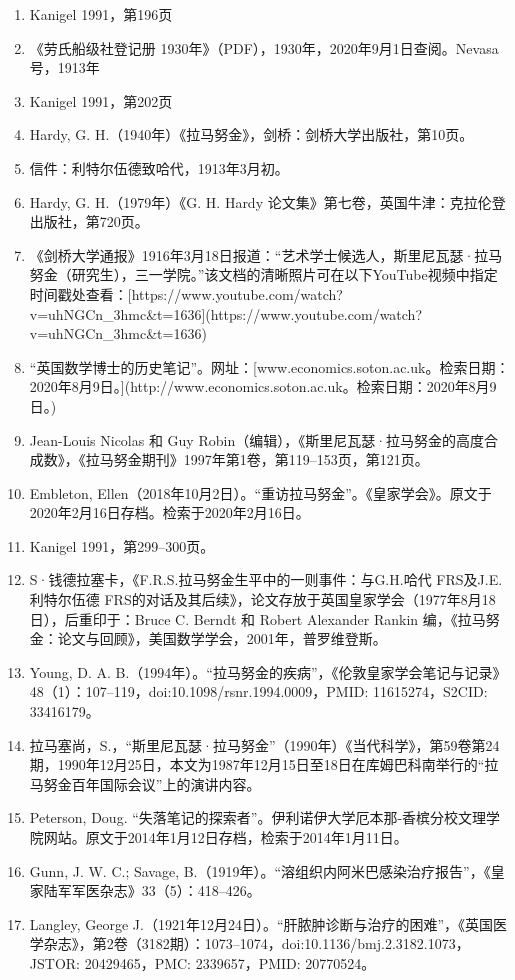 \begin{enumerate}
\item Kanigel 1991，第196页
\item 《劳氏船级社登记册 1930年》（PDF），1930年，2020年9月1日查阅。Nevasa号，1913年
\item Kanigel 1991，第202页
\item Hardy, G. H.（1940年）《拉马努金》，剑桥：剑桥大学出版社，第10页。
\item 信件：利特尔伍德致哈代，1913年3月初。
\item Hardy, G. H.（1979年）《G. H. Hardy 论文集》第七卷，英国牛津：克拉伦登出版社，第720页。
\item 《剑桥大学通报》1916年3月18日报道：“艺术学士候选人，斯里尼瓦瑟·拉马努金（研究生），三一学院。”该文档的清晰照片可在以下YouTube视频中指定时间戳处查看：[https://www.youtube.com/watch?v=uhNGCn\_3hmc\&t=1636](https://www.youtube.com/watch?v=uhNGCn_3hmc&t=1636)
\item “英国数学博士的历史笔记”。网址：[www.economics.soton.ac.uk。检索日期：2020年8月9日。](http://www.economics.soton.ac.uk。检索日期：2020年8月9日。)
\item Jean-Louis Nicolas 和 Guy Robin（编辑），《斯里尼瓦瑟·拉马努金的高度合成数》，《拉马努金期刊》1997年第1卷，第119–153页，第121页。
\item Embleton, Ellen（2018年10月2日）。“重访拉马努金”。《皇家学会》。原文于2020年2月16日存档。检索于2020年2月16日。
\item Kanigel 1991，第299–300页。
\item S·钱德拉塞卡，《F.R.S.拉马努金生平中的一则事件：与G.H.哈代 FRS及J.E.利特尔伍德 FRS的对话及其后续》，论文存放于英国皇家学会（1977年8月18日），后重印于：Bruce C. Berndt 和 Robert Alexander Rankin 编，《拉马努金：论文与回顾》，美国数学学会，2001年，普罗维登斯。
\item Young, D. A. B.（1994年）。“拉马努金的疾病”，《伦敦皇家学会笔记与记录》48（1）：107–119，doi:10.1098/rsnr.1994.0009，PMID: 11615274，S2CID: 33416179。
\item 拉马塞尚，S.，“斯里尼瓦瑟·拉马努金”（1990年）《当代科学》，第59卷第24期，1990年12月25日，本文为1987年12月15日至18日在库姆巴科南举行的“拉马努金百年国际会议”上的演讲内容。
\item Peterson, Doug. “失落笔记的探索者”。伊利诺伊大学厄本那-香槟分校文理学院网站。原文于2014年1月12日存档，检索于2014年1月11日。
\item Gunn, J. W. C.; Savage, B.（1919年）。“溶组织内阿米巴感染治疗报告”，《皇家陆军军医杂志》33（5）：418–426。
\item Langley, George J.（1921年12月24日）。“肝脓肿诊断与治疗的困难”，《英国医学杂志》，第2卷（3182期）：1073–1074，doi:10.1136/bmj.2.3182.1073，JSTOR: 20429465，PMC: 2339657，PMID: 20770524。

\end{enumerate}
